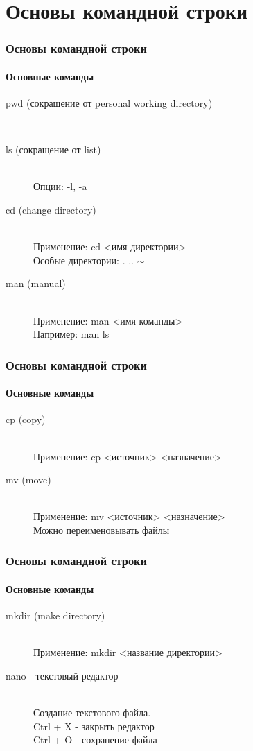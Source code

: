 \documentclass[12pt,pdf,hyperref={unicode}]{beamer}
\begin{document}
\section{Основы командной строки}

\begin{frame}
\frametitle{Основы командной строки} 
\framesubtitle{Основные команды}
\begin{description}
  \item[pwd (сокращение от personal working directory)] \hfill \\
  \item[ls (сокращение от list)] \hfill \\
  Опции: -l, -a
  \item[cd (change directory)] \hfill \\
  Применение: cd <имя директории> \\
  Особые директории: . ..  $\sim$
  \item[man (manual)] \hfill \\
  Применение: man <имя команды>\\
  Например: man ls
\end{description}
\end{frame}

\begin{frame}
\frametitle{Основы командной строки} 
\framesubtitle{Основные команды}
\begin{description}
  \item[cp (copy)] \hfill \\
  Применение: cp <источник> <назначение>
  \item[mv (move)] \hfill \\
  Применение: mv <источник> <назначение>\\
  Можно переименовывать файлы
\end{description}
\end{frame}

\begin{frame}
\frametitle{Основы командной строки} 
\framesubtitle{Основные команды}
\begin{description}
  \item[mkdir (make directory)] \hfill \\
  Применение: mkdir <название директории>
  \item[nano - текстовый редактор] \hfill \\
  Создание текстового файла.\\
  Ctrl + X - закрыть редактор\\
  Ctrl + O - сохранение файла
\end{description}
\end{frame}
\end{document}
